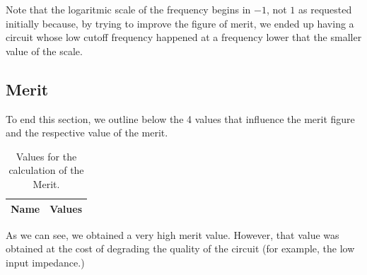 Note that the logaritmic scale of the frequency begins in $-1$, not $1$ as requested initially because, by trying to improve the figure of merit, we ended up having a circuit whose low cutoff frequency happened at a frequency lower that the smaller value of the scale.


\subsection{Merit}
To end this section, we outline below the 4 values that influence the merit figure and the respective value of the merit.

\begin{table}[H]
  \centering
  \begin{tabular}{|l|r|}
    \hline    
    {\bf Name} & {\bf Values} \\ \hline
    
  \end{tabular}
  \caption{Values for the calculation of the Merit.}
\end{table}

As we can see, we obtained a very high merit value. However, that value was obtained at the cost of degrading the quality of the circuit (for example, the low input impedance.)



